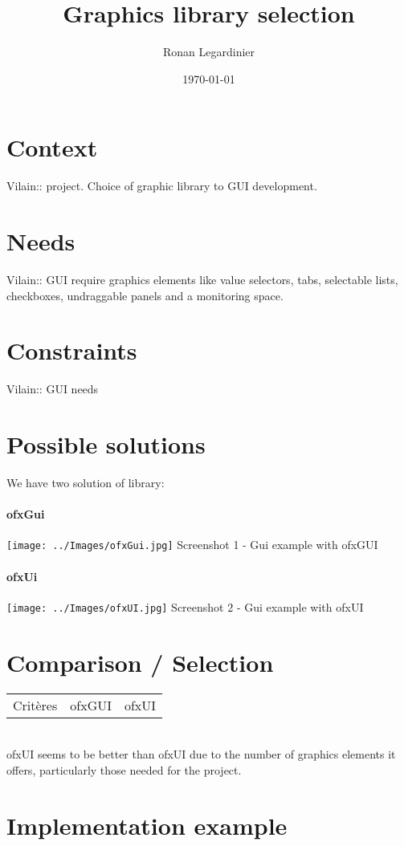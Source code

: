 \documentclass[a4paper,titlepage,oneside]{article}
\author{Ronan Legardinier}
\title{Graphics library selection}
\date{\today{}}
\begin{document}
	\maketitle{}
	\newpage
	
	\tableofcontents{}
	\newpage
	
	\section{Context}
		Vilain:: project. Choice of graphic library to GUI development.
	\section{Needs}
	
		Vilain:: GUI require graphics elements like value selectors, tabs, selectable lists, checkboxes, undraggable panels and a monitoring space.
	\section{Constraints}
		Vilain:: GUI needs 
	\section{Possible solutions}
		We have two solution of library:
			\paragraph{ofxGui}
				\begin{center}
					\texttt{[image: ../Images/ofxGui.jpg]}
					Screenshot 1 - Gui example with ofxGUI
				\end{center}
				
			\newpage
			
			\paragraph{ofxUi}
				\begin{center}
					\texttt{[image: ../Images/ofxUI.jpg]}
					Screenshot 2 - Gui example with ofxUI
				\end{center}
								
	\section{Comparison / Selection}
		\begin{tabular}{ l || c | r }
			Critères & ofxGUI & ofxUI \\
		\end{tabular}\\
		ofxUI seems to be better than ofxUI due to the number of graphics elements it offers, particularly those needed for the project.
	\section{Implementation example}
	
\end{document}
